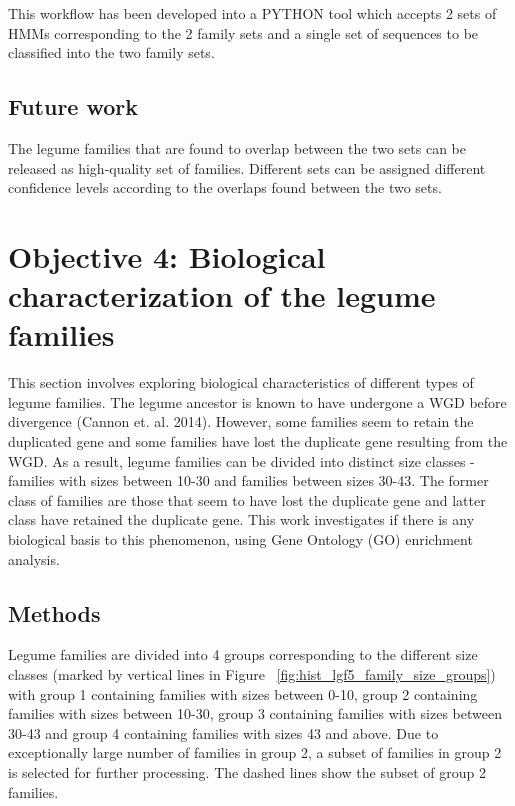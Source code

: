 \documentclass{article}
\begin{document}
		This workflow has been developed into a PYTHON tool which accepts 2 sets of HMMs corresponding to the 2 family sets and a single set of sequences to be classified into the two family sets.
		
		\subsection{Future work}
		The legume families that are found to overlap between the two sets can be released as high-quality set of families. Different sets can be assigned different confidence levels according to the overlaps found between the two sets.
	
	\pagebreak
	\section{Objective 4: Biological characterization of the legume families}
	This section involves exploring biological characteristics of different types of legume families. The legume ancestor is known to have undergone a WGD before divergence (Cannon et. al. 2014).  However, some families seem to retain the duplicated gene and some families have lost the duplicate gene resulting from the WGD. As a result, legume families can be divided into distinct size classes - families with sizes between 10-30 and families between sizes 30-43. The former class of families are those that seem to have lost the duplicate gene and latter class have retained the duplicate gene. This work investigates if there is any biological basis to this phenomenon, using Gene Ontology (GO) enrichment analysis. 
	
		\subsection{Methods}
		Legume families are divided into 4 groups corresponding to the different size classes (marked by vertical lines in Figure ~\ref{fig:hist_lgf5_family_size_groups}) with group 1 containing families with sizes between 0-10, group 2 containing families with sizes between 10-30, group 3 containing families with sizes between 30-43 and group 4 containing families with sizes 43 and above. Due to exceptionally large number of families in group 2, a subset of families in group 2 is selected for further processing. The dashed lines show the subset of group 2 families.
		
\end{document}
